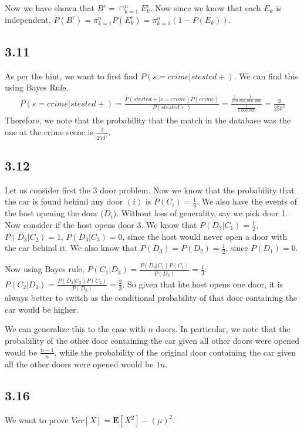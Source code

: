 \documentclass{article}
\begin{document}
	Now we have shown that $B^c = \cap_{k=1}^{n} E_k^c$. Now since we know that each $E_k$ is independent, $P(B^c) = \pi_{k=1}^{n} P(E_k^c) = \pi_{k=1}^{n} (1 - P(E_k))$.
	
	\subsection*{3.11}
	As per the hint, we want to first find $P(s = crime | s tested +)$. We can find this using Bayes Rule.
	\begin{align*}
	P(s = crime | s tested + ) = \frac{P(s tested + | s = crime)P(crime)}{P(s tested +)} = \frac{\frac{1}{250} \frac{1}{250,000,000}}{\frac{1}{3,000,000}} = \frac{3}{250^2}
	\end{align*}
	Therefore, we note that the probability that the match in the database was the one at the crime scene is $\frac{3}{250^2}$. 
	
	\subsection*{3.12}
	Let us consider first the 3 door problem. Now we know that the probability that the car is found behind any door $(i)$ is $P(C_i) = \frac{1}{3}$. We also have the events of the host opening the door ($D_i$). Without loss of generality, say we pick door 1. Now consider if the host opens door 3. We know that $P(D_3 | C_1) = \frac{1}{2}$, $P(D_3 | C_2) = 1$, $P(D_3 | C_3) = 0$, since the host would never open a door with the car behind it. We also know that $P(D_3) = P(D_2) = \frac{1}{2}$, since $P(D_1) = 0$. 
	
	Now using Bayes rule, $P(C_1 | D_3) = \frac{P(D_3 | C_1) P(C_1)}{P(D_3)} = \frac{1}{3}$. $P(C_2 | D_3) = \frac{P(D_3 | C_2)P(C_2)}{P(D_3)} = \frac{2}{3}$. So given that hte host opens one door, it is always better to switch as the conditional probability of that door containing the car would be higher.
	
	We can generalize this to the case with $n$ doors. In particular, we note that the probability of the other door containing the car given all other doors were opened would be $\frac{n-1}{n}$, while the probability of the original door containing the car given all the other doors were opened would be ${1}{n}$. 
	
	\subsection*{3.16}
	We want to prove $Var[X] = \mathbf{E}[X^2] - (\mu)^2$.
	
\end{document}
